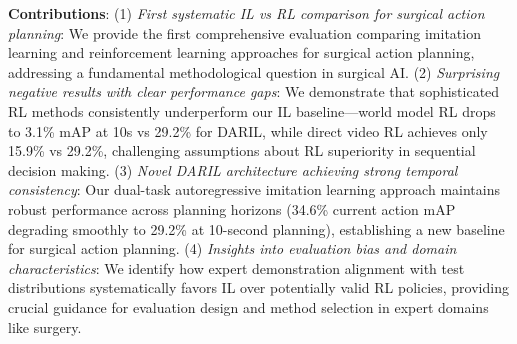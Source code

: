 \documentclass[runningheads]{llncs}
\begin{document}
\textbf{Contributions}: (1) \textit{First systematic IL vs RL comparison for surgical action planning}: We provide the first comprehensive evaluation comparing imitation learning and reinforcement learning approaches for surgical action planning, addressing a fundamental methodological question in surgical AI. (2) \textit{Surprising negative results with clear performance gaps}: We demonstrate that sophisticated RL methods consistently underperform our IL baseline—world model RL drops to 3.1\% mAP at 10s vs 29.2\% for DARIL, while direct video RL achieves only 15.9\% vs 29.2\%, challenging assumptions about RL superiority in sequential decision making. (3) \textit{Novel DARIL architecture achieving strong temporal consistency}: Our dual-task autoregressive imitation learning approach maintains robust performance across planning horizons (34.6\% current action mAP degrading smoothly to 29.2\% at 10-second planning), establishing a new baseline for surgical action planning. (4) \textit{Insights into evaluation bias and domain characteristics}: We identify how expert demonstration alignment with test distributions systematically favors IL over potentially valid RL policies, providing crucial guidance for evaluation design and method selection in expert domains like surgery.



\end{document}
